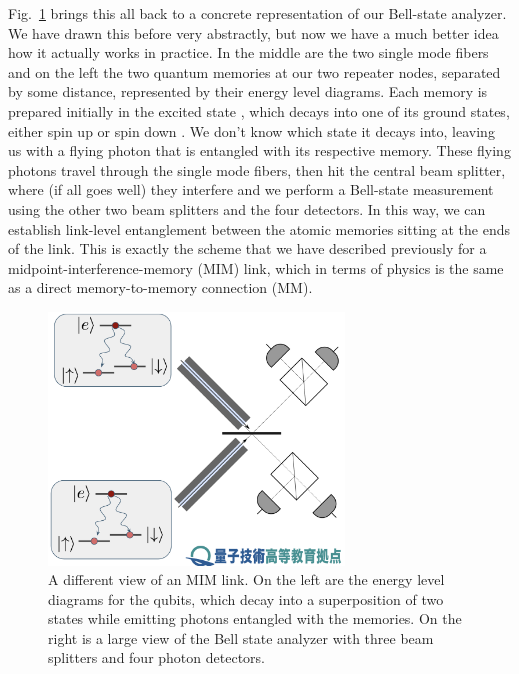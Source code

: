 Fig.~\ref{fig:13-MIM-energy} brings this all back to a concrete representation of our Bell-state analyzer. We have drawn this before very abstractly, but now we have a much better idea how it actually works in practice. In the middle are the two single mode fibers and on the left the two quantum memories at our two repeater nodes, separated by some distance, represented by their energy level diagrams. Each memory is prepared initially in the excited state , which decays into one of its ground states, either spin up \ket{\uparrow} or spin down \ket{\downarrow}. We don't know which state it decays into, leaving us with a flying photon that is entangled with its respective memory. These flying photons travel through the single mode fibers, then hit the central beam splitter, where (if all goes well) they interfere and we perform a Bell-state measurement using the other two beam splitters and the four detectors. In this way, we can establish link-level entanglement between the atomic memories sitting at the ends of the link. This is exactly the scheme that we have described previously for a midpoint-interference-memory (MIM) link, which in terms of physics is the same as a direct memory-to-memory connection (MM).

\begin{figure}[t]
    \centering
    \includegraphics[width=0.7\textwidth]{lesson13/MIM-with-energy-levels.png}
    \caption[MIM with energy levels]{A different view of an MIM link. On the left are the energy level diagrams for the qubits, which decay into a superposition of two states while emitting photons entangled with the memories. On the right is a large view of the Bell state analyzer with three beam splitters and four photon detectors.}
    \label{fig:13-MIM-energy}
\end{figure}




